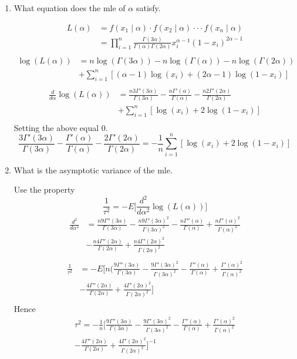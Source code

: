 \documentclass{tufte-book}
\theoremstyle{mytheoremstyle}
\theoremstyle{mylemstyle}
\theoremstyle{mydefstyle}
\begin{document}
\begin{enumerate}
\item What equation does the mle of $\alpha$ satisfy.

\begin{align*}
L(\alpha) &= f(x_1 \mid \alpha)\cdot f(x_2 \mid \alpha) \cdot\cdot\cdot f(x_n \mid \alpha)\\
&= \prod_{i=1}^n \frac{\Gamma(3\alpha)}{\Gamma(\alpha)\Gamma(2\alpha)} x_i^{\alpha-1}(1-x_i)^{2\alpha -1}\\
\end{align*}
\begin{align*}
\log(L(\alpha)) &= n\log(\Gamma(3\alpha))-n\log(\Gamma(\alpha))-n\log(\Gamma(2\alpha))\\
 & + \sum_{i=1}^n[(\alpha-1)\log(x_i) + (2\alpha-1)\log(1-x_i)]\\
\end{align*}
\begin{align*}
\frac{d}{d\alpha}\log(L(\alpha)) &=\frac{n3 \Gamma'(3\alpha)}{\Gamma(3\alpha)} -\frac{n \Gamma'(\alpha)}{\Gamma(\alpha)} - \frac{n2 \Gamma'(2\alpha)}{\Gamma(2\alpha)}\\
&+  \sum_{i=1}^n[\log(x_i) + 2\log(1-x_i)]\\
\end{align*}
Setting the above equal $0$.
\[
\frac{3 \Gamma'(3\alpha)}{\Gamma(3\alpha)} -\frac{ \Gamma'(\alpha)}{\Gamma(\alpha)} - \frac{2 \Gamma'(2\alpha)}{\Gamma(2\alpha)}
= -\frac{1}{n} \sum_{i=1}^n[\log(x_i) + 2\log(1-x_i)]
\]

\item What is the asymptotic variance of the mle.

Use the property
\[ \frac{1}{\tau^2} = -E\Big[\frac{d^2}{d\alpha^2}\log(L(\alpha))\Big] \]
\begin{align*}
\frac{d^2}{d\alpha^2} &= \frac{n9 \Gamma''(3\alpha)}{\Gamma(3\alpha)} - \frac{n9 \Gamma'(3\alpha)^2}{\Gamma(3\alpha)^2} -\frac{n \Gamma''(\alpha)}{\Gamma(\alpha)} +\frac{n \Gamma'(\alpha)^2}{\Gamma(\alpha)^2}\\
 &- \frac{n4 \Gamma''(2\alpha)}{\Gamma(2\alpha)} + \frac{n4 \Gamma'(2\alpha)^2}{\Gamma(2\alpha)^2} \\
\end{align*}
\begin{align*}
\frac{1}{\tau^2} &= -E\Big[n(\frac{9 \Gamma''(3\alpha)}{\Gamma(3\alpha)} - \frac{9 \Gamma'(3\alpha)^2}{\Gamma(3\alpha)^2} -\frac{ \Gamma''(\alpha)}{\Gamma(\alpha)} +\frac{ \Gamma'(\alpha)^2}{\Gamma(\alpha)^2}\\
 &- \frac{4 \Gamma''(2\alpha)}{\Gamma(2\alpha)} + \frac{4 \Gamma'(2\alpha)^2}{\Gamma(2\alpha)^2}\Big] \\
\end{align*}
Hence
\begin{multline}
\tau^2 = -\frac{1}{n}\big[\frac{9 \Gamma''(3\alpha)}{\Gamma(3\alpha)} - \frac{9 \Gamma'(3\alpha)^2}{\Gamma(3\alpha)^2} -\frac{ \Gamma''(\alpha)}{\Gamma(\alpha)} +\frac{ \Gamma'(\alpha)^2}{\Gamma(\alpha)^2}\\
 - \frac{4 \Gamma''(2\alpha)}{\Gamma(2\alpha)} + \frac{4 \Gamma'(2\alpha)^2}{\Gamma(2\alpha)^2}\Big]^{-1}
\end{multline}
\end{enumerate}
\end{document}
